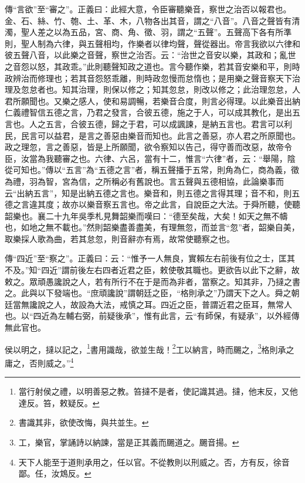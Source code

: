 {\noindent\zhuan{}\fzbyks 傳“言欲”至“審之”。正義曰：此經大意，令臣審聽樂音，察世之治否以報君也。金、石、絲、竹、匏、土、革、木，八物各出其音，謂之“八音”。八音之聲皆有清濁，聖人差之以為五品，宮、商、角、徵、羽，謂之“五聲”。五聲高下各有所準則，聖人制為六律，與五聲相均，作樂者以律均聲，聲從器出。帝言我欲以六律和彼五聲八音，以此樂之音聲，察世之治否。云：“治世之音安以樂，其政和；亂世之音怨以怒，其政乖。”此則聽聲知政之道也。言今聽作樂，若其音安樂和平，則時政辨治而修理也；若其音怨怒乖離，則時政忽慢而怠惰也；是用樂之聲音察天下治理及忽怠者也。知其治理，則保以修之；知其忽怠，則改以修之；此治理忽怠，人君所願聞也。又樂之感人，使和易調暢，若樂音合度，則言必得理。以此樂音出納仁義禮智信五德之言，乃君之發言，合彼五德，施之于人，可以成其教化，是出五言也。人之五言，合彼五德，歸之于君，可以成諷諫，是納五言也。君言可以利民，民言可以益君，是言之善惡由樂音而知也。此言之善惡，亦人君之所原聞也。政之理忽，言之善惡，皆是上所願聞，欲令察知以告己，得守善而改惡，故帝令臣，汝當為我聽審之也。六律、六呂，當有十二，惟言“六律”者，云：“舉陽，陰從可知也。”傳以“五言”為“五德之言”者，稱五聲播于五常，則角為仁，商為義，徵為禮，羽為智，宮為信，之所稱必有舊說也。言五聲與五德相協，此論樂事而云“出納五言”，知是出納五德之言也。樂音和，則五德之言得其理；音不和，則五德之言違其度；故亦以樂音察五言也。帝之此言，自說臣之大法。于舜所聽，使聽韶樂也。襄二十九年吳季札見舞韶樂而嘆曰：“德至矣哉，大矣！如天之無不幬也，如地之無不載也。”然則韶樂盡善盡美，有理無忽，而並言“忽”者，韶樂自美，取樂採人歌為曲，若其怠忽，則音辭亦有焉，故常使聽察之也。 \par}

{\noindent\zhuan{}\fzbyks 傳“四近”至“察之”。正義曰：云：“惟予一人無良，實賴左右前後有位之士，匡其不及。”知“四近”謂前後左右四者近君之臣，敕使敬其職也。更欲告以此下之辭，故敕之。眾頑愚讒說之人，若有所行不在于是而為非者，當察之。知其非，乃撻之書之。此與以下發端也。“庶頑讒說”謂朝廷之臣，“格則承之”乃謂天下之人。舜之朝廷當無讒說之人，故設為大法，戒慎之耳。四近之臣，普謂近君之臣耳，無常人也。以“四近為左輔右弼，前疑後承”，惟有此言，云“有師保，有疑承”，以外經傳無此官也。 \par}

侯以明之，撻以記之，\footnote{當行射侯之禮，以明善惡之教。笞撻不是者，使記識其過。撻，他末反，又他達反。笞，敕疑反。}書用識哉，欲並生哉！\footnote{書識其非，欲使改悔，與共並生。}工以納言，時而颺之，\footnote{工，樂官，掌誦詩以納諫，當是正其義而颺道之。颺音揚。}格則承之庸之，否則威之。”\footnote{天下人能至于道則承用之，任以官。不從教則以刑威之。否，方有反，徐音鄙。任，汝鴆反。}

